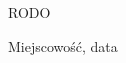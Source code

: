 \documentclass[helvetica,narrow,openbib,polish]{europecv}
\begin{document}
\begin{europecv}
%

\end{europecv}

RODO
\vspace{0.5cm}
\begin{flushright}
Miejscowo\'s\'c, data
\end{flushright}
\end{document}
